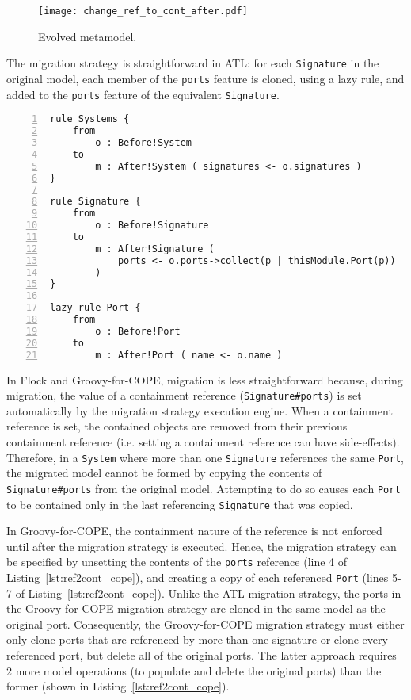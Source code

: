 \begin{figure}[htbp]
  \centering
  \texttt{[image: change\_ref\_to\_cont\_after.pdf]}
  \caption{Evolved metamodel.}
  \label{fig:ref2cont_evolved_mm}
\end{figure}

The migration strategy is straightforward in ATL: for each \texttt{Signature} in the original model, each member of the \texttt{ports} feature is cloned, using a lazy rule, and added to the \texttt{ports} feature of the equivalent \texttt{Signature}.

\begin{lstlisting}[basicstyle=\ttfamily\footnotesize, flexiblecolumns=true, numbers=left, nolol=true, caption=Change R to C model migration in ATL, label=lst:ref2cont_atl, language=ATL, tabsize=2]
rule Systems {
	from
		o : Before!System
	to
		m : After!System ( signatures <- o.signatures )
}

rule Signature {
	from
		o : Before!Signature
	to
		m : After!Signature (
			ports <- o.ports->collect(p | thisModule.Port(p))
		)
}

lazy rule Port {
	from
		o : Before!Port
	to
		m : After!Port ( name <- o.name )
\end{lstlisting}

In Flock and Groovy-for-COPE, migration is less straightforward because, during migration, the value of a containment reference (\texttt{Signature\#ports}) is set automatically by the migration strategy execution engine. When a containment reference is set, the contained objects are removed from their previous containment reference (i.e. setting a containment reference can have side-effects). Therefore, in a \texttt{System} where more than one \texttt{Signature} references the same \texttt{Port}, the migrated model cannot be formed by copying the contents of \texttt{Signature\#ports} from the original model. Attempting to do so causes each \texttt{Port} to be contained only in the last referencing \texttt{Signature} that was copied.

In Groovy-for-COPE, the containment nature of the reference is not enforced until after the migration strategy is executed. Hence, the migration strategy can be specified by unsetting the contents of the \texttt{ports} reference (line 4 of Listing~\ref{lst:ref2cont_cope}), and creating a copy of each referenced \texttt{Port} (lines 5-7 of Listing~\ref{lst:ref2cont_cope}). Unlike the ATL migration strategy, the ports in the Groovy-for-COPE migration strategy are cloned in the same model as the original port. Consequently, the Groovy-for-COPE migration strategy must either only clone ports that are referenced by more than one signature or clone every referenced port, but delete all of the original ports. The latter approach requires 2 more model operations (to populate and delete the original ports) than the former (shown in Listing~\ref{lst:ref2cont_cope}).

